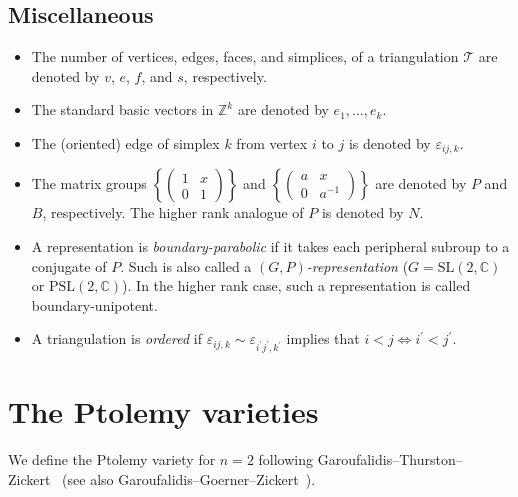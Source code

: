 \documentclass[12pt]{amsart}
\theoremstyle{definition}
\numberwithin{equation}{section}
\def\SL{\mathrm{SL}}
\def\PSL{\mathrm{PSL}}
\def\Z{\mathbb{Z}}
\def\C{\mathbb{C}}
\def\T{\mathcal{T}}
\begin{document}
\subsection{Miscellaneous}
\begin{itemize}
\item The number of vertices, edges, faces, and simplices, of a triangulation $\T$ are denoted by $v$, $e$, $f$, and $s$, respectively.
\item The standard basic vectors in $\Z^k$ are denoted by $e_1,\dots,e_{k}$. 
\item The (oriented) edge of simplex $k$ from vertex $i$ to $j$ is denoted by $\varepsilon_{ij,k}$. 
\item The matrix groups $\left\{\left(\begin{smallmatrix}1&x\\0&1\end{smallmatrix}\right)\right\}$ and $\left\{\left(\begin{smallmatrix}a&x\\0&a^{-1}\end{smallmatrix}\right)\right\}$ are denoted by $P$ and $B$, respectively. The higher rank analogue of $P$ is denoted by $N$.
\item A representation is \emph{boundary-parabolic} if it takes each peripheral subroup to a conjugate of $P$. Such is also called a \emph{$(G,P)$-representation} ($G=\SL(2,\C)$ or $\PSL(2,\C)$). In the higher rank case, such a representation is called boundary-unipotent.
\item A triangulation is \emph{ordered} if $\varepsilon_{ij,k}\sim \varepsilon_{i^\prime j^\prime,k^\prime}$ implies that $i<j\iff i^\prime<j^\prime$.
\end{itemize}


\section{The Ptolemy varieties}\label{sec:PtolemyVariety}
We define the Ptolemy variety for $n=2$ following Garoufalidis--Thurston--Zickert~\cite{GaroufalidisThurstonZickert} (see also Garoufalidis--Goerner--Zickert~\cite{GaroufalidisGoernerZickert}).
\end{document}
